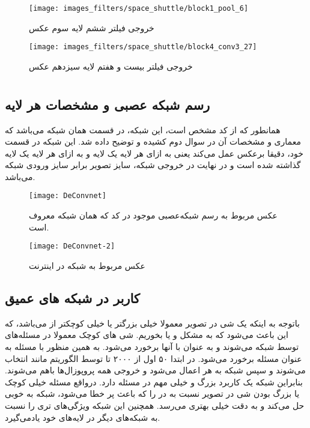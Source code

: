 \documentclass{article}
\begin{document}
\begin{figure}[H]
	\centerline{\texttt{[image: images\_filters/space\_shuttle/block1\_pool\_6]}}
	\caption{خروجی فیلتر ششم لایه سوم عکس }
\end{figure}

\begin{figure}[H]
	\centerline{\texttt{[image: images\_filters/space\_shuttle/block4\_conv3\_27]}}
	\caption{خروجی فیلتر بیست و هفتم لایه سیزدهم عکس }
\end{figure}



\section{}
\subsection{رسم شبکه عصبی و مشخصات هر لایه}
همانطور که از کد مشخص است، این شبکه، در قسمت  همان شبکه  می‌باشد که معماری و مشخصات آن در سوال دوم کشیده و توضیح داده شد. این شبکه در قسمت  خود، دقیقا برعکس  عمل می‌کند یعنی به ازای هر لایه  یک لایه  و به ازای هر لایه  یک لایه  گذاشته شده است و در نهایت در خروجی شبکه، سایز تصویر برابر 
سایز ورودی شبکه می‌باشد.
\begin{figure}[H]
	\centerline{\texttt{[image: DeConvnet]}}
	\caption{عکس مربوط به رسم شبکه‌عصبی موجود در کد  که همان شبکه معروف  است.}
\end{figure}

\begin{figure}[H]
	\centerline{\texttt{[image: DeConvnet-2]}}
	\caption{عکس مربوط به شبکه  در اینترنت}
\end{figure}
\subsection{کاربر در شبکه های عمیق}
باتوجه به اینکه یک شی در تصویر معمولا خیلی بزرگتر یا خیلی کوچکتر از  می‌باشد، که این باعث می‌شود که به مشکل  و یا  بخوریم. شی های کوچک معمولا در مسئله‌های  توسط شبکه  می‌شوند و به عنوان  با آنها برخورد می‌شود. به همین منظور با مسئله به عنوان مسئله برخورد می‌شود. در ابتدا ۵۰  اول از ۲۰۰۰ تا توسط الگوریتم  مانند  انتخاب می‌شوند و سپس  شبکه  به هر  اعمال می‌شود و خروجی همه پروپوزال‌ها باهم   می‌شوند. بنابراین شبکه  یک کاربرد بزرگ و خیلی مهم در مسئله  دارد. درواقع مسئله خیلی کوچک یا بزرگ بودن شی در تصویر نسبت به  در  را که باعث  پر خطا می‌شود، شبکه  به خوبی حل  می‌کند و به دقت خیلی بهتری می‌رسد. همچنین این شبکه ویژگی‌های  تری را نسبت به شبکه‌های دیگر در لایه‌های خود یادمی‌گیرد.
\end{document}
